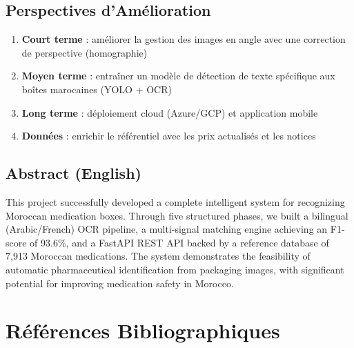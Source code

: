 \documentclass[12pt,a4paper]{report}
\begin{document}
\section*{Perspectives d'Am\'elioration}

\begin{enumerate}
  \item \textbf{Court terme} : am\'eliorer la gestion des images en angle avec une correction de perspective (homographie)
  \item \textbf{Moyen terme} : entra\^iner un mod\`ele de d\'etection de texte sp\'ecifique aux bo\^ites marocaines (YOLO + OCR)
  \item \textbf{Long terme} : d\'eploiement cloud (Azure/GCP) et application mobile
  \item \textbf{Donn\'ees} : enrichir le r\'ef\'erentiel avec les prix actualis\'es et les notices
\end{enumerate}

\section*{Abstract (English)}


This project successfully developed a complete intelligent system for recognizing Moroccan medication boxes. Through five structured phases, we built a bilingual (Arabic/French) OCR pipeline, a multi-signal matching engine achieving an F1-score of 93.6\%, and a FastAPI REST API backed by a reference database of 7,913 Moroccan medications. The system demonstrates the feasibility of automatic pharmaceutical identification from packaging images, with significant potential for improving medication safety in Morocco.



\chapter*{R\'ef\'erences Bibliographiques}
\end{document}
